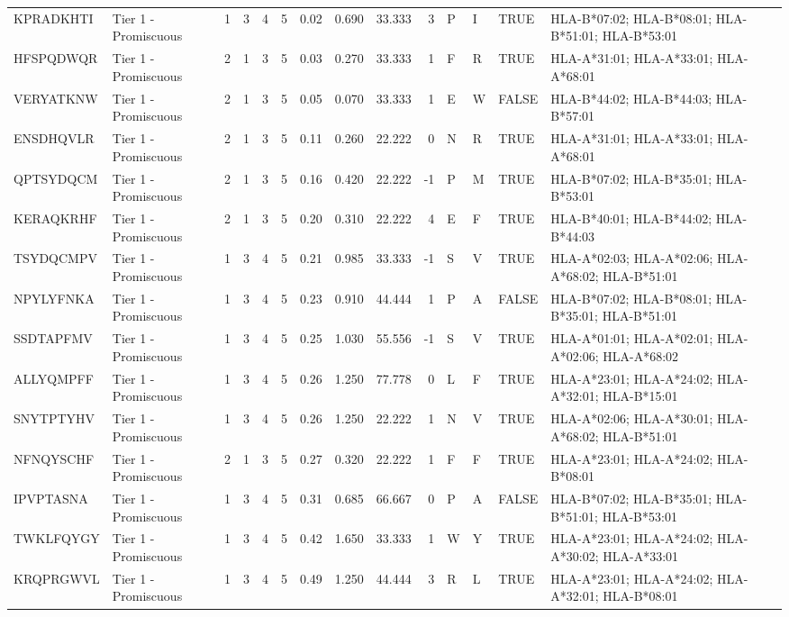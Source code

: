 \documentclass[
]{article}
\begin{document}
\begin{longtable}[t]{llrrrrrrrrllll}
KPRADKHTI & Tier 1 - Promiscuous & 1 & 3 & 4 & 5 & 0.02 & 0.690 & 33.333 & 3 & P & I & TRUE & HLA-B*07:02; HLA-B*08:01; HLA-B*51:01; HLA-B*53:01\\
HFSPQDWQR & Tier 1 - Promiscuous & 2 & 1 & 3 & 5 & 0.03 & 0.270 & 33.333 & 1 & F & R & TRUE & HLA-A*31:01; HLA-A*33:01; HLA-A*68:01\\
VERYATKNW & Tier 1 - Promiscuous & 2 & 1 & 3 & 5 & 0.05 & 0.070 & 33.333 & 1 & E & W & FALSE & HLA-B*44:02; HLA-B*44:03; HLA-B*57:01\\
ENSDHQVLR & Tier 1 - Promiscuous & 2 & 1 & 3 & 5 & 0.11 & 0.260 & 22.222 & 0 & N & R & TRUE & HLA-A*31:01; HLA-A*33:01; HLA-A*68:01\\
\addlinespace
QPTSYDQCM & Tier 1 - Promiscuous & 2 & 1 & 3 & 5 & 0.16 & 0.420 & 22.222 & -1 & P & M & TRUE & HLA-B*07:02; HLA-B*35:01; HLA-B*53:01\\
KERAQKRHF & Tier 1 - Promiscuous & 2 & 1 & 3 & 5 & 0.20 & 0.310 & 22.222 & 4 & E & F & TRUE & HLA-B*40:01; HLA-B*44:02; HLA-B*44:03\\
TSYDQCMPV & Tier 1 - Promiscuous & 1 & 3 & 4 & 5 & 0.21 & 0.985 & 33.333 & -1 & S & V & TRUE & HLA-A*02:03; HLA-A*02:06; HLA-A*68:02; HLA-B*51:01\\
NPYLYFNKA & Tier 1 - Promiscuous & 1 & 3 & 4 & 5 & 0.23 & 0.910 & 44.444 & 1 & P & A & FALSE & HLA-B*07:02; HLA-B*08:01; HLA-B*35:01; HLA-B*51:01\\
SSDTAPFMV & Tier 1 - Promiscuous & 1 & 3 & 4 & 5 & 0.25 & 1.030 & 55.556 & -1 & S & V & TRUE & HLA-A*01:01; HLA-A*02:01; HLA-A*02:06; HLA-A*68:02\\
\addlinespace
ALLYQMPFF & Tier 1 - Promiscuous & 1 & 3 & 4 & 5 & 0.26 & 1.250 & 77.778 & 0 & L & F & TRUE & HLA-A*23:01; HLA-A*24:02; HLA-A*32:01; HLA-B*15:01\\
SNYTPTYHV & Tier 1 - Promiscuous & 1 & 3 & 4 & 5 & 0.26 & 1.250 & 22.222 & 1 & N & V & TRUE & HLA-A*02:06; HLA-A*30:01; HLA-A*68:02; HLA-B*51:01\\
NFNQYSCHF & Tier 1 - Promiscuous & 2 & 1 & 3 & 5 & 0.27 & 0.320 & 22.222 & 1 & F & F & TRUE & HLA-A*23:01; HLA-A*24:02; HLA-B*08:01\\
IPVPTASNA & Tier 1 - Promiscuous & 1 & 3 & 4 & 5 & 0.31 & 0.685 & 66.667 & 0 & P & A & FALSE & HLA-B*07:02; HLA-B*35:01; HLA-B*51:01; HLA-B*53:01\\
TWKLFQYGY & Tier 1 - Promiscuous & 1 & 3 & 4 & 5 & 0.42 & 1.650 & 33.333 & 1 & W & Y & TRUE & HLA-A*23:01; HLA-A*24:02; HLA-A*30:02; HLA-A*33:01\\
\addlinespace
KRQPRGWVL & Tier 1 - Promiscuous & 1 & 3 & 4 & 5 & 0.49 & 1.250 & 44.444 & 3 & R & L & TRUE & HLA-A*23:01; HLA-A*24:02; HLA-A*32:01; HLA-B*08:01\\

\end{longtable}
\end{document}
